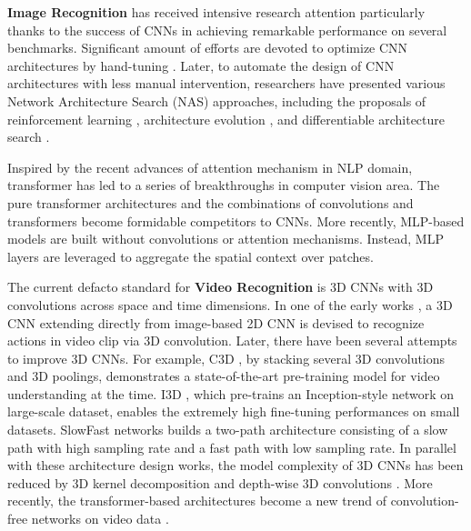 \documentclass[10pt,twocolumn,letterpaper]{article}
\begin{document}
\textbf{Image Recognition} has received intensive research attention particularly thanks to the success of CNNs in achieving remarkable performance on several benchmarks. Significant amount of efforts are devoted to optimize CNN architectures by hand-tuning \cite{krizhevsky2012imagenet,szegedy2015going,simonyan2014very,ioffe2015batch,he2015deep,xie2017aggregated,howard2017mobilenets,zhang2018shufflenet,hu2018squeeze}.
Later, to automate the design of CNN architectures with less manual intervention, researchers have presented various Network Architecture Search (NAS) approaches, including the proposals of reinforcement learning  \cite{zoph2017neural,liu2017progressive,pham2018efficient}, architecture evolution \cite{liu2018hierarchical,luo2018neural}, and differentiable architecture search \cite{liu2018darts,chen2019progressive,li2020sgas}.

Inspired by the recent advances of attention mechanism \cite{vaswani2017attention} in NLP domain, transformer has led to a series of breakthroughs in computer vision area. The pure transformer architectures \cite{liu2021swin,wang2021pyramid,huang2021shuffle,dosovitskiy2020image} and the combinations of convolutions and transformers \cite{srinivas2021bottleneck,li2021bossnas,wu2021cvt,touvron2021going,li2021contextual} become formidable competitors to CNNs. More recently, MLP-based models \cite{yu2021s,chen2021cyclemlp,tolstikhin2021mlp,hou2021vision} are built without convolutions or attention mechanisms. Instead, MLP layers are leveraged to aggregate the spatial context over patches.

The current defacto standard for \textbf{Video Recognition} is 3D CNNs with 3D convolutions across space and time dimensions. In one of the early works \cite{ji20133d}, a 3D CNN extending directly from image-based 2D CNN is devised to recognize actions in video clip via 3D convolution. Later, there have been several attempts to improve 3D CNNs. For example, C3D \cite{tran2015learning}, by stacking several 3D convolutions and 3D poolings, demonstrates a state-of-the-art pre-training model for video understanding at the time. I3D \cite{carreira2017quo}, which pre-trains an Inception-style network \cite{szegedy2015going} on large-scale dataset, enables the extremely high fine-tuning performances on small datasets. SlowFast networks \cite{feichtenhofer2019slowfast} builds a two-path architecture consisting of a slow path with high sampling rate and a fast path with low sampling rate. In parallel with these architecture design works, the model complexity of 3D CNNs has been reduced by 3D kernel decomposition \cite{qiu2017learning,tran2018closer,xie2018rethinking} and depth-wise 3D convolutions \cite{tran2019video,feichtenhofer2020x3d}. More recently, the transformer-based architectures become a new trend of convolution-free networks on video data \cite{bertasius2021space,arnab2021vivit,liu2021video,zhang2021vidtr,neimark2021video,zhang2021token,fan2021multiscale,patrick2021keeping}.
\end{document}
